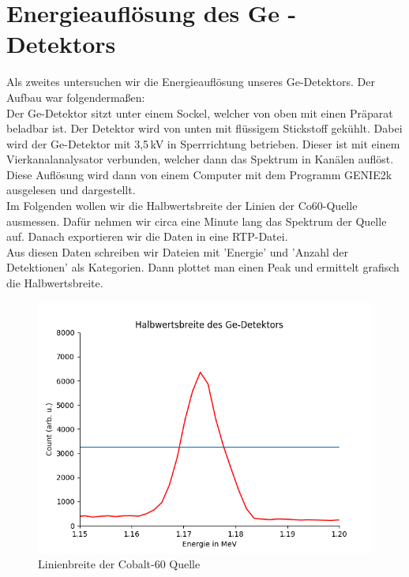\section{Energieauflösung des Ge - Detektors}

Als zweites untersuchen wir die Energieauflösung unseres Ge-Detektors. Der Aufbau war folgendermaßen:\\
Der Ge-Detektor sitzt unter einem Sockel, welcher von oben mit einen Präparat beladbar ist. Der Detektor wird von unten mit flüssigem 
Stickstoff gekühlt. Dabei wird der Ge-Detektor mit 3,5\,kV in Sperrrichtung betrieben. Dieser ist mit einem Vierkanalanalysator verbunden, 
welcher dann das 
Spektrum in Kanälen auflöst. Diese Auflösung wird dann von einem Computer mit dem Programm GENIE2k ausgelesen und dargestellt.\\
Im Folgenden wollen wir die Halbwertsbreite der Linien der Co60-Quelle ausmessen. Dafür nehmen wir circa eine Minute lang das Spektrum 
der Quelle auf. Danach exportieren wir die Daten in eine RTP-Datei.\\

Aus diesen Daten schreiben wir Dateien mit 'Energie' und 'Anzahl der Detektionen' als Kategorien. Dann plottet man einen Peak und ermittelt grafisch die Halbwertsbreite.

\begin{figure}[ht]
    \centering
    \includegraphics[width = \linewidth]{Bilder/Auswertung/Halbwertsbreite.png}
    \caption{Linienbreite der Cobalt-60 Quelle}
    \label{bild:linienbreite}
\end{figure}

